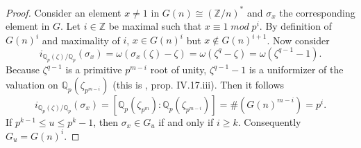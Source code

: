 \documentclass[paper=a4, fontsize=11pt]{scrartcl} %
\numberwithin{equation}{section} %
\numberwithin{figure}{section} %
\numberwithin{table}{section} %
\theoremstyle{break}
\begin{document}
\begin{proof}
Consider an element $x\not=1$ in $G(n)\cong (\mathbb{Z}/n)^*$ and $\sigma_x$ the corresponding element in $G$. Let $i\in\mathbb{Z}$ be maximal such that $x \equiv 1 \; mod\;p^i$. By definition of $G(n)^i$ and maximality of $i$, $x\in G(n)^i$ but $x\not\in G(n)^{i+1}$. Now consider
$$
i_{\mathbb{Q}_p(\zeta)/\mathbb{Q}_p}(\sigma_x) = \omega(\sigma_x(\zeta)-\zeta) = \omega(\zeta^q-\zeta)=\omega(\zeta^{q-1}-1).
$$
Because $\zeta^{q-1}$ is a primitive $p^{m-i}$ root of unity, $\zeta^{q-1}-1$ is a uniformizer of the valuation on $\mathbb{Q}_p(\zeta_{p^{m-i}})$ (this is \cite{Serre}, prop. IV.17.iii). Then it follows
$$
i_{\mathbb{Q}_p(\zeta)/\mathbb{Q}_p}(\sigma_x) = [\mathbb{Q}_p(\zeta_{p^{m}}):\mathbb{Q}_p(\zeta_{p^{m-i}})]=\#(G(n)^{m-i})=p^i.
$$
If $p^{k-1} \leq u \leq p^k -1$, then $\sigma_x\in G_u$ if and only if $i\geq k$. Consequently $G_u = G(n)^i$.
\end{proof}
\end{document}
